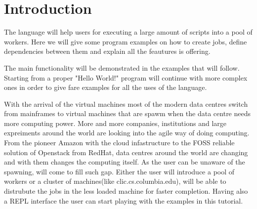 \section{Introduction}
\label{sect:intro}
The \lang{} language will help users for executing a large amount of scripts into a pool of workers.
Here we will give some program examples on how to create jobs, define dependencies between them and
explain all the feautures \lang{} is offering.


The main functionality will be demonstrated in the examples that will follow. Starting from a 
proper "Hello World!" program will continue with more complex ones in order to give fare examples
for all the uses of the language.


With the arrival of the virtual machines most of the modern data centres switch from mainframes to
virtual machines that are spawm when the data centre needs more computing power. More and more companies,
institutions and large expreiments around the world are looking into the agile way of doing computing. From the
pioneer Amazon with the cloud infastructure to the FOSS reliable solution of Openstack from RedHat,
data centres around the world are changing and with them changes the computing itself.
As the user can be unaware of the spawning, \lang{} will come to fill such gap. Either the user will
introduce a pool of workers or a cluster of machines(like clic.cs.columbia.edu), \lang{} will be 
able to distrubute the jobs in the less loaded machine for faster completion. Having also a REPL
interface the user can start playing with the examples in this tutorial.
